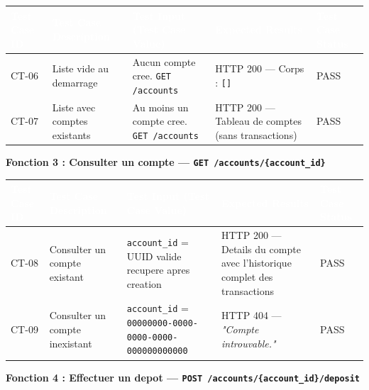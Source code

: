 \documentclass[12pt,a4paper]{article}
\begin{document}
\begin{longtable}{|L{1.6cm}|L{3.8cm}|L{5.2cm}|L{4.2cm}|L{1.8cm}|}
\hline
{}
\textbf{\textcolor{white}{Test Case ID}} & \textbf{\textcolor{white}{Test Case Description}} & \textbf{\textcolor{white}{Test Input (Test Case Value)}} & \textbf{\textcolor{white}{Expected Results}} & \textbf{\textcolor{white}{Test Case Status}} \\
\hline
CT-06 & Liste vide au demarrage & Aucun compte cree. \newline \texttt{GET /accounts} & HTTP 200 --- Corps : \texttt{[]} & PASS \\
\hline
{}
CT-07 & Liste avec comptes existants & Au moins un compte cree. \newline \texttt{GET /accounts} & HTTP 200 --- Tableau de comptes (sans transactions) & PASS \\
\hline
\end{longtable}

\vspace{0.2cm}
{\bfseries\textcolor{danger}{Fonction 3 : Consulter un compte --- \texttt{GET /accounts/\{account\_id\}}}}
\vspace{0.1cm}

\begin{longtable}{|L{1.6cm}|L{3.8cm}|L{5.2cm}|L{4.2cm}|L{1.8cm}|}
\hline
{}
\textbf{\textcolor{white}{Test Case ID}} & \textbf{\textcolor{white}{Test Case Description}} & \textbf{\textcolor{white}{Test Input (Test Case Value)}} & \textbf{\textcolor{white}{Expected Results}} & \textbf{\textcolor{white}{Test Case Status}} \\
\hline
CT-08 & Consulter un compte existant & \texttt{account\_id} = UUID valide recupere apres creation & HTTP 200 --- Details du compte avec l'historique complet des transactions & PASS \\
\hline
{}
CT-09 & Consulter un compte inexistant & \texttt{account\_id} = \texttt{00000000-0000-0000-0000-000000000000} & HTTP 404 --- \textit{"Compte introuvable."} & PASS \\
\hline
\end{longtable}

\vspace{0.2cm}
{\bfseries\textcolor{danger}{Fonction 4 : Effectuer un depot --- \texttt{POST /accounts/\{account\_id\}/deposit}}}
\vspace{0.1cm}
\end{document}
